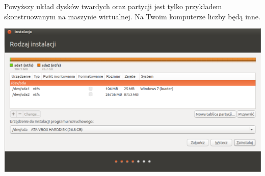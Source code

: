 Powyższy układ dysków twardych oraz partycji jest tylko przykładem skonstruowanym na maszynie wirtualnej. Na Twoim komputerze liczby będą inne.
\clearpage
\begin{center}
        \includegraphics[width=\linewidth]{images/instalator_partycjonowanie_gparted2_czysty.png}
\end{center}

